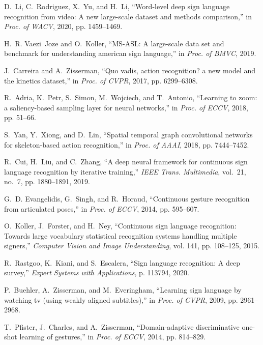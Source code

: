 \documentclass[journal]{IEEEtran}
\begin{document}
\begin{thebibliography}{10}
	D.~Li, C.~Rodriguez, X.~Yu, and H.~Li, ``Word-level deep sign language
	recognition from video: A new large-scale dataset and methods comparison,''
	in \emph{Proc. of WACV}, 2020, pp. 1459--1469.
	
	H.~R. Vaezi~Joze and O.~Koller, ``{MS-ASL}: A large-scale data set and
	benchmark for understanding american sign language,'' in \emph{Proc. of
		BMVC}, 2019.
	
	J.~Carreira and A.~Zisserman, ``Quo vadis, action recognition? a new model and
	the kinetics dataset,'' in \emph{Proc. of CVPR}, 2017, pp. 6299--6308.
	
	R.~Adria, K.~Petr, S.~Simon, M.~Wojciech, and T.~Antonio, ``Learning to zoom: a
	saliency-based sampling layer for neural networks,'' in \emph{Proc. of ECCV},
	2018, pp. 51--66.
	
	S.~Yan, Y.~Xiong, and D.~Lin, ``Spatial temporal graph convolutional networks
	for skeleton-based action recognition,'' in \emph{Proc. of AAAI}, 2018, pp.
	7444--7452.
	
	R.~Cui, H.~Liu, and C.~Zhang, ``A deep neural framework for continuous sign
	language recognition by iterative training,'' \emph{IEEE Trans. Multimedia},
	vol.~21, no.~7, pp. 1880--1891, 2019.
	
	G.~D. Evangelidis, G.~Singh, and R.~Horaud, ``Continuous gesture recognition
	from articulated poses,'' in \emph{Proc. of ECCV}, 2014, pp. 595--607.
	
	O.~Koller, J.~Forster, and H.~Ney, ``Continuous sign language recognition:
	Towards large vocabulary statistical recognition systems handling multiple
	signers,'' \emph{Computer Vision and Image Understanding}, vol. 141, pp.
	108--125, 2015.
	
	R.~Rastgoo, K.~Kiani, and S.~Escalera, ``Sign language recognition: A deep
	survey,'' \emph{Expert Systems with Applications}, p. 113794, 2020.
	
	P.~Buehler, A.~Zisserman, and M.~Everingham, ``Learning sign language by
	watching tv (using weakly aligned subtitles),'' in \emph{Proc. of CVPR},
	2009, pp. 2961--2968.
	
	T.~Pfister, J.~Charles, and A.~Zisserman, ``Domain-adaptive discriminative
	one-shot learning of gestures,'' in \emph{Proc. of ECCV}, 2014, pp. 814--829.
	

\end{thebibliography}
\end{document}
